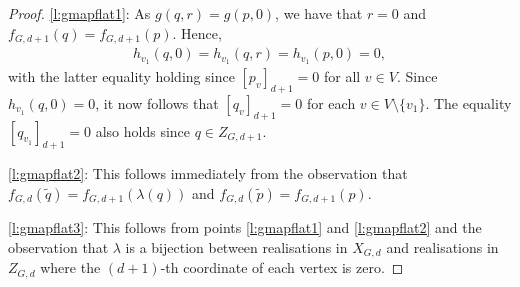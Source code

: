 \documentclass[ALCO]{cedram}
\begin{document}
\begin{proof}
	\ref{l:gmapflat1}:
	As $g(q,r) = g(p,0)$,
	we have that $r=0$ and $f_{G,d+1}(q)=f_{G,d+1}(p)$.
	Hence,
	\begin{align*}
		h_{v_1}(q,0) = h_{v_1}(q,r) = h_{v_1}(p,0) = 0,
	\end{align*}
	with the latter equality holding since $[p_v]_{d+1}=0$ for all $v \in V$.
	Since $h_{v_1}(q,0) = 0$,
	it now follows that $[q_v]_{d+1}=0$ for each $v \in V \setminus \{v_1\}$.
	The equality $[q_{v_1}]_{d+1} = 0$ also holds since $q \in Z_{G,d+1}$.
	
	\ref{l:gmapflat2}:
	This follows immediately from the observation that $f_{G,d}(\tilde{q}) = f_{G,d+1}(\lambda(q))$ and $f_{G,d}(\tilde{p}) = f_{G,d+1}(p)$.
	
	\ref{l:gmapflat3}:
	This follows from points \ref{l:gmapflat1} and \ref{l:gmapflat2} and the observation that $\lambda$ is a bijection between realisations in $X_{G,d}$ and realisations in $Z_{G,d}$ where the $(d+1)$-th coordinate of each vertex is zero.
	

\end{proof}
\end{document}
